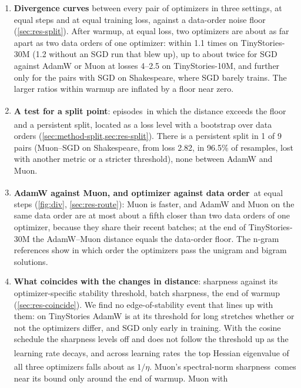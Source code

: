 \documentclass[10pt]{article}
\makeatletter
\renewcommand\paragraph{\@startsection{paragraph}{4}{\z@}{1.2ex \@plus .4ex \@minus .2ex}{-1em}{\normalfont\normalsize\bfseries}}
\newcommand{\extra}{\textsuperscript{\dag}}  %
\makeatother
\begin{document}
\paragraph{Contributions.}
\begin{enumerate}[leftmargin=1.5em]
\item \textbf{Divergence curves} between every pair of optimizers in three settings, at equal steps and at
  equal training loss, against a data-order noise floor (\cref{sec:res-split}). After warmup, at equal loss,
  two optimizers are about as far apart as two data orders of one optimizer: within 1.1 times on TinyStories-30M
  (1.2 without an SGD run that blew up),
  up to about twice for SGD against AdamW or Muon at losses 4--2.5 on TinyStories-10M, and further only for the pairs
  with SGD on Shakespeare, where SGD barely trains. The larger ratios within warmup are inflated by a floor
  near zero.
\item \textbf{A test for a split point}: episodes\extra\ in which the distance exceeds the floor and a
  persistent split\extra, located as a loss level with a bootstrap over data orders (\cref{sec:method-split,sec:res-split}).
  There is a persistent split in 1 of 9 pairs (Muon--SGD on Shakespeare, from loss 2.82, in 96.5\% of
  resamples, lost with another metric or a stricter threshold), none between AdamW and Muon.
\item \textbf{AdamW against Muon, and optimizer against data order}\extra\ at equal steps (\cref{fig:div},
  \cref{sec:res-route}): Muon is faster, and AdamW and Muon on the same data order are at most about a fifth
  closer than two data orders of one optimizer, because they share their recent batches; at the end of
  TinyStories-30M the AdamW--Muon distance equals the data-order floor. The n-gram references show in which
  order the optimizers pass the unigram and bigram solutions.
\item \textbf{What coincides with the changes in distance}: sharpness against its optimizer-specific
  stability threshold, batch sharpness, the end of warmup (\cref{sec:res-coincide}). We find no edge-of-stability
  event that lines up with them: on TinyStories AdamW is at its threshold for long stretches whether or not the optimizers differ, and SGD only
  early in training. With the cosine schedule the sharpness levels off and does not follow the threshold up as the
  learning rate decays, and across learning rates\extra\ the top Hessian eigenvalue of all three optimizers falls about
  as $1/\eta$. Muon's spectral-norm sharpness\extra\ comes near its bound only around the end of warmup. Muon with

\end{enumerate}
\end{document}
